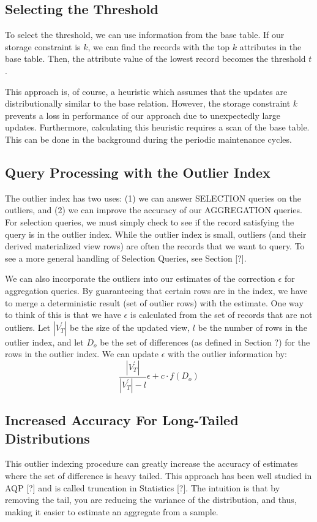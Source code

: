 \subsection{Selecting the Threshold}
To select the threshold, we can use information from the base table.
If our storage constraint is $k$, we can find the records with the top $k$ attributes in the base table. 
Then, the attribute value of the lowest record becomes the threshold $t$.

This approach is, of course, a heuristic which assumes that the updates are distributionally similar to the 
base relation. 
However, the storage constraint $k$ prevents a loss in performance of our approach due to unexpectedly large updates.
Furthermore, calculating this heuristic requires a scan of the base table.
This can be done in the background during the periodic maintenance cycles.

\subsection{Query Processing with the Outlier Index}
The outlier index has two uses: (1) we can answer SELECTION queries on the outliers, 
and (2) we can improve the accuracy of our AGGREGATION queries.
For selection queries, we must simply check to see if the record satisfying the query is in the outlier index.
While the outlier index is small, outliers (and their derived materialized view rows) are often the records that
we want to query.
To see a more general handling of Selection Queries, see Section [?].

We can also incorporate the outliers into our estimates of the correction
$\epsilon$ for aggregation queries. By guaranteeing that certain rows are in the index, we
have to merge a deterministic result (set of outlier rows) with the
estimate. One way to think of this is that we have $\epsilon$ is
calculated from the set of records that are not outliers. Let $|V_{T}^{'}|$
be the size of the updated view, $l$ be the number of rows in the
outlier index, and let $D_{o}$ be the set of differences (as defined
in Section ?) for the rows in the outlier index. We can update $\epsilon$
with the outlier information by:
\[
\frac{|V_{T}^{'}|}{|V_{T}^{'}|-l}\epsilon+c\cdot f(D_{o})
\]


\subsection{Increased Accuracy For Long-Tailed Distributions}
This outlier indexing procedure can greatly increase the accuracy
of estimates where the set of difference is heavy tailed. This approach
has been well studied in AQP {[}?{]} and is called truncation in Statistics
{[}?{]}. The intuition is that by removing the tail, you are reducing
the variance of the distribution, and thus, making it easier to estimate
an aggregate from a sample.